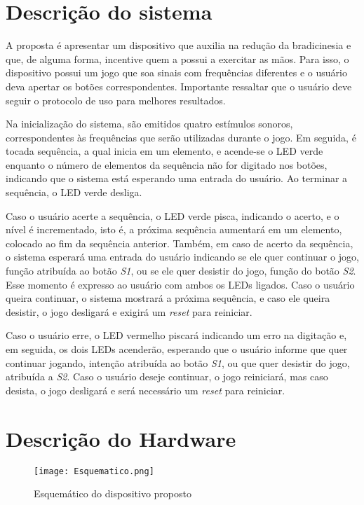 \documentclass[conference]{IEEEtran}
\begin{document}
\section{Descrição do sistema}

A proposta é apresentar um dispositivo que auxilia na redução da bradicinesia e que, de alguma forma, incentive quem a possui a exercitar as mãos. Para isso, o dispositivo possui um jogo que soa sinais com frequências diferentes e o usuário deva apertar os botões correspondentes. Importante ressaltar que o usuário deve seguir o protocolo de uso para melhores resultados.

Na inicialização do sistema, são emitidos quatro estímulos sonoros, correspondentes às frequências que serão utilizadas durante o jogo. Em seguida, é tocada sequência, a qual inicia em um elemento, e acende-se o LED verde enquanto o número de elementos da sequência não for digitado nos botões, indicando que o sistema está esperando uma entrada do usuário. Ao terminar a sequência, o LED verde desliga.

Caso o usuário acerte a sequência, o LED verde pisca, indicando o acerto, e o nível é incrementado, isto é, a próxima sequência aumentará em um elemento, colocado ao fim da sequência anterior. Também, em caso de acerto da sequência, o sistema esperará uma entrada do usuário indicando se ele quer continuar o jogo, função atribuída ao botão \emph{S1}, ou se ele quer desistir do jogo, função do botão \emph{S2}. Esse momento é expresso ao usuário com ambos os LEDs ligados. Caso o usuário queira continuar, o sistema mostrará a próxima sequência, e caso ele queira desistir, o jogo desligará e exigirá um \emph{reset} para reiniciar.

Caso o usuário erre, o LED vermelho piscará indicando um erro na digitação e, em seguida, os dois LEDs acenderão, esperando que o usuário informe que quer continuar jogando, intenção atribuída ao botão \emph{S1}, ou que quer desistir do jogo, atribuída a \emph{S2}. Caso o usuário deseje continuar, o jogo reiniciará, mas caso desista, o jogo desligará e será necessário um \emph{reset} para reiniciar.

\section{Descrição do Hardware}

\begin{figure}[!t]
	\centering 
	\texttt{[image: Esquematico.png]} 
	\caption{Esquemático do dispositivo proposto}
	\label{esq} 
\end{figure}
\end{document}
